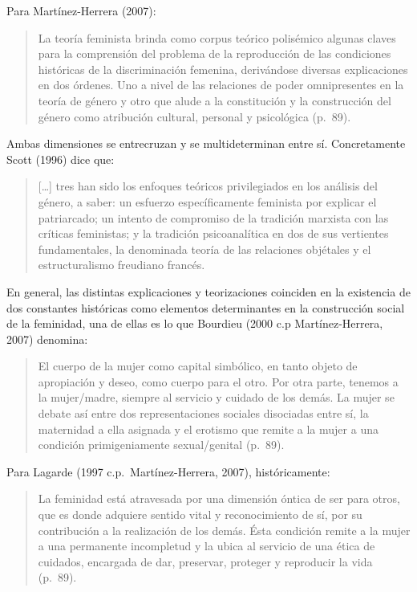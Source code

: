 Para Martínez-Herrera (2007):

\begin{quote}
    La teoría feminista brinda como corpus teórico polisémico algunas claves para
    la comprensión del problema de la reproducción de las condiciones históricas de
    la discriminación femenina, derivándose diversas explicaciones en dos órdenes.
    Uno a nivel de las relaciones de poder omnipresentes en la teoría de género y
    otro que alude a la constitución y la construcción del género como atribución
    cultural, personal y psicológica (p.~89).
\end{quote}

Ambas dimensiones se entrecruzan y se multideterminan entre sí.
Concretamente Scott (1996) dice que:

\begin{quote}
    […] tres han sido los enfoques teóricos privilegiados en los análisis del
    género, a saber: un esfuerzo específicamente feminista por explicar el
    patriarcado;
    un intento de compromiso de la tradición marxista con las críticas feministas;
    y la tradición psicoanalítica en dos de sus vertientes fundamentales, la
    denominada teoría de las relaciones objétales y el estructuralismo freudiano
    francés.
\end{quote}

En general, las distintas explicaciones y teorizaciones coinciden en la
existencia de dos constantes históricas como elementos determinantes en la
construcción social de la feminidad, una de ellas es lo que Bourdieu (2000 c.p
Martínez-Herrera, 2007) denomina:

\begin{quote}
    El cuerpo de la mujer como capital simbólico, en tanto objeto de apropiación
    y deseo, como cuerpo para el otro.
    Por otra parte, tenemos a la mujer/madre, siempre al servicio y cuidado de los
    demás.
    La mujer se debate así entre dos representaciones sociales disociadas entre sí,
    la maternidad a ella asignada y el erotismo que remite a la mujer a una
    condición primigeniamente sexual/genital (p.~89).
\end{quote}

Para Lagarde (1997 c.p.~Martínez-Herrera, 2007), históricamente:

\begin{quote}
    La feminidad está atravesada por una dimensión óntica de ser para otros, que es
    donde adquiere sentido vital y reconocimiento de sí, por su contribución a la
    realización de los demás.
    Ésta condición remite a la mujer a una permanente incompletud y la
    ubica al servicio de una ética de cuidados, encargada de dar,
    preservar, proteger y reproducir la vida (p.~89).
\end{quote}

